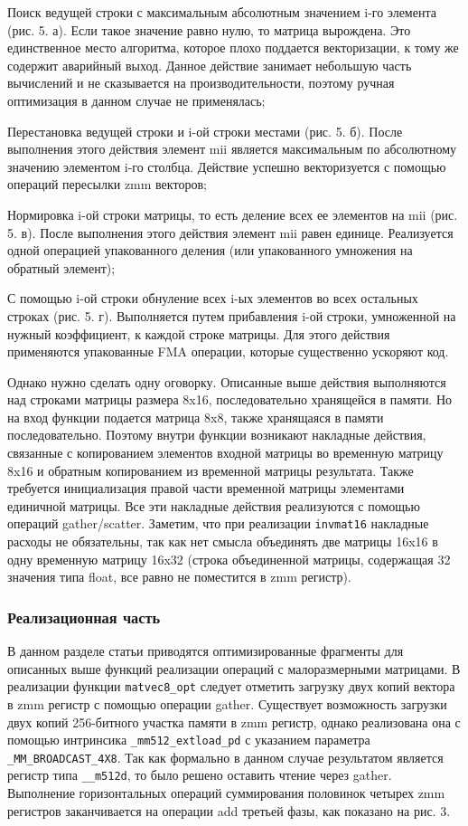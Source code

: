 Поиск ведущей строки с максимальным абсолютным значением i-го элемента (рис. 5. а).
Если такое значение равно нулю, то матрица вырождена.
Это единственное место алгоритма, которое плохо поддается векторизации, к тому же содержит аварийный выход.
Данное действие занимает небольшую часть вычислений и не сказывается на производительности, поэтому ручная оптимизация в данном случае не применялась;

Перестановка ведущей строки и i-ой строки местами (рис. 5. б).
После выполнения этого действия элемент mii является максимальным по абсолютному значению элементом i-го столбца.
Действие успешно векторизуется с помощью операций пересылки zmm векторов;

Нормировка i-ой строки матрицы, то есть деление всех ее элементов на mii (рис. 5. в).
После выполнения этого действия элемент mii равен единице.
Реализуется одной операцией упакованного деления (или упакованного умножения на обратный элемент);

С помощью i-ой строки обнуление всех i-ых элементов во всех остальных строках (рис. 5. г).
Выполняется путем прибавления i-ой строки, умноженной на нужный коэффициент, к каждой строке матрицы.
Для этого действия применяются упакованные FMA операции, которые существенно ускоряют код.

Однако нужно сделать одну оговорку.
Описанные выше действия выполняются над строками матрицы размера 8x16, последовательно хранящейся в памяти.
Но на вход функции подается матрица 8x8, также хранящаяся в памяти последовательно.
Поэтому внутри функции возникают накладные действия, связанные с копированием элементов входной матрицы во временную матрицу 8x16 и обратным копированием из временной матрицы результата.
Также требуется инициализация правой части временной матрицы элементами единичной матрицы.
Все эти накладные действия реализуются с помощью операций gather/scatter.
Заметим, что при реализации \texttt{invmat16} накладные расходы не обязательны, так как нет смысла объединять две матрицы 16x16 в одну временную матрицу 16x32 (строка объединенной матрицы, содержащая 32 значения типа float, все равно не поместится в zmm регистр).

\subsubsection{Реализационная часть}

В данном разделе статьи приводятся оптимизированные фрагменты для описанных выше функций реализации операций с малоразмерными матрицами.
В реализации функции \texttt{matvec8\_opt} следует отметить загрузку двух копий вектора в zmm регистр с помощью операции gather.
Существует возможность загрузки двух копий 256-битного участка памяти в zmm регистр, однако реализована она с помощью интринсика \texttt{\_mm512\_extload\_pd} с указанием параметра \texttt{\_MM\_BROADCAST\_4X8}.
Так как формально в данном случае результатом является регистр типа \texttt{\_\_m512d}, то было решено оставить чтение через gather.
Выполнение горизонтальных операций суммирования половинок четырех zmm регистров заканчивается на операции add третьей фазы, как показано на рис. 3.

